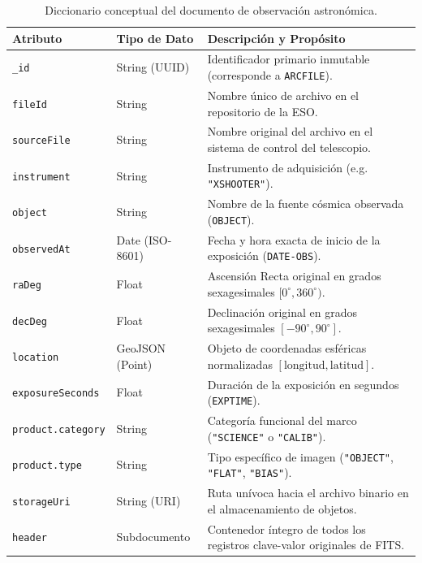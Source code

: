 \documentclass[10pt]{article}
\begin{document}
\begin{table}[ht]
\centering
\small
\caption{Diccionario conceptual del documento de observación astronómica.}
\label{tab:diccionario_documento}
\begin{tabularx}{\textwidth}{lp{2.8cm}X}
\toprule
\textbf{Atributo} & \textbf{Tipo de Dato} & \textbf{Descripción y Propósito} \\
\midrule
\texttt{\_id} & String (UUID) & Identificador primario inmutable (corresponde a \texttt{ARCFILE}). \\
\texttt{fileId} & String & Nombre único de archivo en el repositorio de la ESO. \\
\texttt{sourceFile} & String & Nombre original del archivo en el sistema de control del telescopio. \\
\texttt{instrument} & String & Instrumento de adquisición (e.g. \texttt{"XSHOOTER"}). \\
\texttt{object} & String & Nombre de la fuente cósmica observada (\texttt{OBJECT}). \\
\texttt{observedAt} & Date (ISO-8601) & Fecha y hora exacta de inicio de la exposición (\texttt{DATE-OBS}). \\
\texttt{raDeg} & Float & Ascensión Recta original en grados sexagesimales $[0^{\circ}, 360^{\circ})$. \\
\texttt{decDeg} & Float & Declinación original en grados sexagesimales $[-90^{\circ}, 90^{\circ}]$. \\
\texttt{location} & GeoJSON (Point) & Objeto de coordenadas esféricas normalizadas $[\text{longitud}, \text{latitud}]$. \\
\texttt{exposureSeconds} & Float & Duración de la exposición en segundos (\texttt{EXPTIME}). \\
\texttt{product.category} & String & Categoría funcional del marco (\texttt{"SCIENCE"} o \texttt{"CALIB"}). \\
\texttt{product.type} & String & Tipo específico de imagen (\texttt{"OBJECT"}, \texttt{"FLAT"}, \texttt{"BIAS"}). \\
\texttt{storageUri} & String (URI) & Ruta unívoca hacia el archivo binario en el almacenamiento de objetos. \\
\texttt{header} & Subdocumento & Contenedor íntegro de todos los registros clave-valor originales de FITS. \\
\bottomrule
\end{tabularx}
\end{table}
\end{document}
